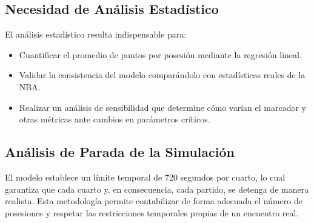 \documentclass[12pt]{article}
\begin{document}
\subsection{Necesidad de Análisis Estadístico}
El análisis estadístico resulta indispensable para:
\begin{itemize}
	\item Cuantificar el promedio de puntos por posesión mediante la regresión lineal.
	\item Validar la consistencia del modelo comparándolo con estadísticas reales de la NBA.
	\item Realizar un análisis de sensibilidad que determine cómo varían el marcador y otras métricas ante cambios en parámetros críticos.
\end{itemize}

\subsection{Análisis de Parada de la Simulación}
El modelo establece un límite temporal de 720 segundos por cuarto, lo cual garantiza que cada cuarto y, en consecuencia, cada partido, se detenga de manera realista. Esta metodología permite contabilizar de forma adecuada el número de posesiones y respetar las restricciones temporales propias de un encuentro real.

\newpage
\end{document}
